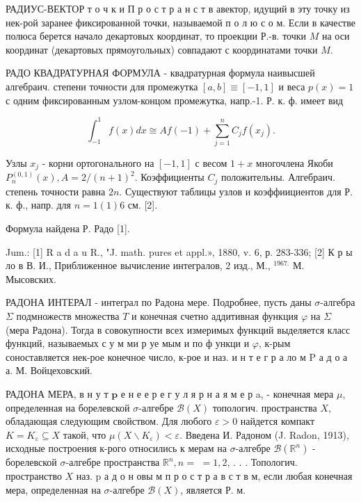 \documentclass[10pt]{article}
\begin{document}
РАДИУС-ВЕКТОР т о ч к и П р о с т р а н с т в авектор, идущий в эту точку из нек-рой заранее фиксированной точки, называемой п о л ю с о м. Если в качестве полюса берется начало декартовых координат, то проекции Р.-в. точки $M$ на оси координат (декартовых прямоугольных) совпадают с координатами точки $M$.



РАДО КВАДРАТУРНАЯ ФОРМУЛА - квадратурная формула наивысшей алгебраич. степени точности для промежутка $[a, b] \equiv[-1,1]$ и веса $p(x)=1$ с одним фиксированным узлом-концом промежутка, напр.-1. Р. к. ф. имеет вид



\[

\int_{-1}^{1} f(x) d x \cong A f(-1)+\sum_{j=1}^{n} C_{j} f\left(x_{j}\right) .

\]



Узлы $x_{j}$ - корни ортогонального на $[-1,1]$ с весом $1+x$ многочлена Якоби $P_{n}^{(0,1)}(x), A=2 /(n+1)^{2}$. Коэффициенты $C_{j}$ положительны. Алгебраич. степень точности равна $2 n$. Существуют таблицы узлов и коэффиициентов для Р. к. ф., напр. для $n=1(1) 6$ см. [2].



Формула найдена Р. Радо [1].



Jum.: [1] R a d a u R., "J. math. pures et appl.», 1880, v. 6, р. 283-336; [2] К р ы ло в В. И., Приближенное вычисление интегралов, 2 изд., М., ${ }^{1967 .}$ М. Мысовских.

РАДОНА ИНТЕРАЛ - интеграл по Радона мере. Подробнее, пусть даны $\sigma$-алгебра $\Sigma$ подмножеств множества $T$ и конечная счетно аддитивная функция $\varphi$ на $\Sigma$ (мера Радона). Тогда в совокупности всех измеримых функций выделяется класс функций, называемых с у м ми р уе мым и по ф ункци и $\varphi$, к-рым соноставляется нек-рое конечное число, к-рое и наз. и н т е г р а ло м $\mathrm{P}$ а д о а а. М. Войцеховский.



РАДОНА МЕРА, в н у т $\mathbf{p}$ е н е е р е г у л я р н а я м е р a, - конечная мера $\mu$, определенная на борелевской $\sigma$-алгебре $\mathscr{B}(X)$ топологич. пространства $X$, обладающая следующим свойством. Для любого $\varepsilon>0$ найдется компакт $K=K_{\varepsilon} \subseteq X$ такой, что $\mu\left(X \backslash K_{\varepsilon}\right)<\varepsilon$. Введена И. Радоном (J. Radon, 1913), исходные построения к-рого относились к мерам на $\sigma$-алгебре $\mathscr{B}\left(\mathbb{R}^{n}\right)$ - борелевской $\sigma$-алгебре пространства $\mathbb{R}^{n}, n=$ $=1,2$, . . . Топологич. пространство $X$ наз. $\mathrm{p}$ а д о н овы м п р о с т р а в с т в м, если любая конечная мера, определенная на $\sigma$-алгебре $\mathscr{B}(X)$, является Р. м.
\end{document}

